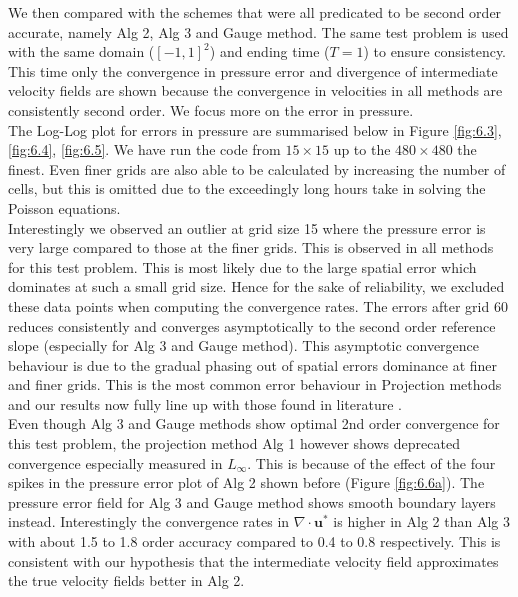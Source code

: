 We then compared with the schemes that were all predicated to be second order accurate, namely Alg 2, Alg 3 and Gauge method. The same test problem is used with the same domain ($[-1,1]^2$) and ending time ($T=1$) to ensure consistency. This time only the convergence in pressure error and divergence of intermediate velocity fields are shown because the convergence in velocities in all methods are consistently second order. We focus more on the error in pressure.\\

The Log-Log plot for errors in pressure are summarised below in Figure \ref{fig:6.3}, \ref{fig:6.4}, \ref{fig:6.5}. We have run the code from $15 \times 15$ up to the $480 \times 480$ the finest. Even finer grids are also able to be calculated by increasing the number of cells, but this is omitted due to the exceedingly long hours take in solving the Poisson equations.\\

Interestingly we observed an outlier at grid size 15 where the pressure error is very large compared to those at the finer grids. This is observed in all methods for this test problem. This is most likely due to the large spatial error which dominates at such a small grid size. Hence for the sake of reliability, we excluded these data points when computing the convergence rates. The errors after grid 60 reduces consistently and converges asymptotically to the second order reference slope (especially for Alg 3 and Gauge method). This asymptotic convergence behaviour is due to the gradual phasing out of spatial errors dominance at finer and finer grids. This is the most common error behaviour in Projection methods and our results now fully line up with those found in literature \cite{guermond2004error}. \\

Even though Alg 3 and Gauge methods show optimal 2nd order convergence for this test problem, the projection method Alg 1 however shows deprecated convergence especially measured in $L_\infty$. This is because of the effect of the four spikes in the pressure error plot of Alg 2 shown before (Figure \ref{fig:6.6a}). The pressure error field for Alg 3 and Gauge method shows smooth boundary layers instead. Interestingly the convergence rates in $\nabla \cdot \textbf{u}^*$ is higher in Alg 2 than Alg 3 with about 1.5 to 1.8 order accuracy compared to 0.4 to 0.8 respectively. This is consistent with our hypothesis that the intermediate velocity field approximates the true velocity fields better in Alg 2. \\

